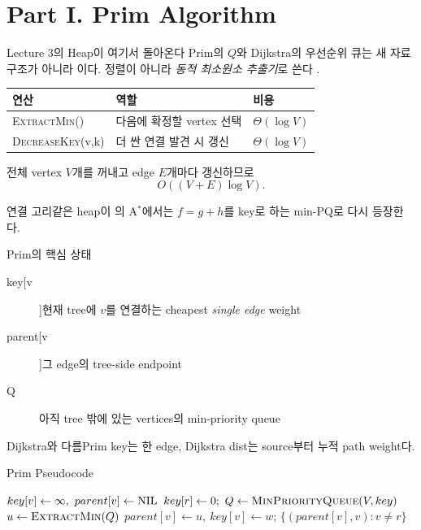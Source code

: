\section{Part I. Prim Algorithm}
\begin{frame}{Lecture 3의 Heap이 여기서 돌아온다}
Prim의 \(Q\)와 Dijkstra의 우선순위 큐는 새 자료구조가 아니라
이다. 정렬이 아니라 \emph{동적 최소원소 추출기}로 쓴다
.
\begin{center}
\begin{tabular}{lll}\toprule
연산 & 역할 & 비용\\\midrule
\textsc{ExtractMin}()      & 다음에 확정할 vertex 선택 & \(\Theta(\log V)\)\\
\textsc{DecreaseKey}(v,k)  & 더 싼 연결 발견 시 갱신    & \(\Theta(\log V)\)\\
\bottomrule
\end{tabular}
\end{center}
전체 vertex \(V\)개를 꺼내고 edge \(E\)개마다 갱신하므로
\[
O\!\left((V+E)\log V\right).
\]
\begin{block}{연결 고리}같은 heap이 의 A\(^*\)에서는 \(f=g+h\)를 key로 하는 min-PQ로 다시 등장한다.\end{block}
\end{frame}
\begin{frame}{Prim의 핵심 상태}
\begin{description}\item[key[v]]현재 tree에 \(v\)를 연결하는 cheapest \emph{single edge} weight\item[parent[v]]그 edge의 tree-side endpoint\item[Q]아직 tree 밖에 있는 vertices의 min-priority queue\end{description}
\begin{alertblock}{Dijkstra와 다름}Prim key는 한 edge, Dijkstra dist는 source부터 누적 path weight다.\end{alertblock}
\end{frame}
\begin{frame}{Prim Pseudocode}
\algofont\begin{algorithmic}[1]
\State \(key[v]\gets\infty,\ parent[v]\gets\NIL\)\EndFor
\State \(key[r]\gets0;\ Q\gets\Call{MinPriorityQueue}{V,key}\)
\State \(u\gets\Call{ExtractMin}{Q}\)
\State \(parent[v]\gets u,\ key[v]\gets w\); \EndIf\EndFor\EndWhile
\State\Return \(\{(parent[v],v):v\ne r\}\)\EndProcedure
\end{algorithmic}
\end{frame}
